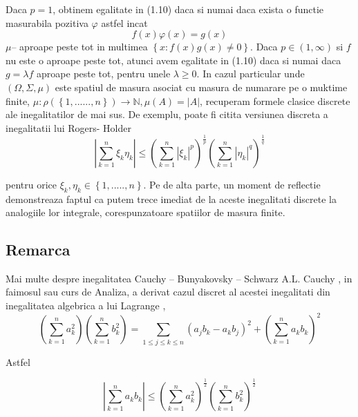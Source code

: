 \documentclass[a4paper,12pt,oneside]{report}
\begin{document}
Daca \(p = 1\), obtinem egalitate in (1.10) daca si numai daca exista o functie masurabila pozitiva \(\varphi\) astfel incat 
\begin{displaymath}
  f\left ( x \right )\varphi \left ( x \right ) = g\left ( x \right )
\end{displaymath}
\(\mu –\) aproape peste tot in multimea \(\left \{ x : f\left ( x \right )g\left ( x \right )\neq 0 \right \}\). 
	Daca \(p \in \left ( 1 , \infty  \right )\) si \(f\) nu este o aproape peste tot, atunci avem egalitate in (1.10) daca si numai daca  \(g = \lambda f\) aproape peste tot, pentru unele \(\lambda \geq 0\). 
	In  cazul particular unde \(\left ( \Omega , \Sigma, \mu \right )\) este spatiul de masura asociat cu masura de numarare pe o muktime finite, \(\mu  : \rho \left ( \left \{ 1,......, n \right \} \right )\rightarrow \mathbb{N}, \mu \left ( A \right ) = \left | A \right |\), 
recuperam formele clasice discrete ale inegalitatilor de mai sus. De exemplu, poate fi citita versiunea discreta a inegalitatii lui Rogers- Holder
\begin{displaymath}
  \left | \sum_{k=1}^{n} \xi _{k}\eta _{k}\right |\leq \left ( \sum_{k = 1}^{n}\left | \xi _{k}\right |^{p}  \right )^{\frac{1}{p}}\left ( \sum_{k = 1}^{n} \left | \eta _{k} \right |^{q}\right )^{\frac{1}{q}}
\end{displaymath}

pentru  orice \(\xi _{k}, \eta _{k} \in \left \{ 1,.....,n \right \}.\) Pe de alta parte, un moment de reflectie demonstreaza faptul ca putem trece imediat de la aceste inegalitati discrete la analogiile lor integrale, corespunzatoare spatiilor de masura finite. 

\subsection{Remarca}

Mai multe despre inegalitatea Cauchy – Bunyakovsky – Schwarz
A.L. Cauchy , in faimosul sau curs de Analiza, a derivat cazul discret al acestei inegalitati din inegalitatea algebrica a  lui Lagrange ,
\begin{displaymath}
  \left ( \sum_{k = 1}^{n} a_{k}^{2}\right )\left ( \sum_{k = 1}^{n} b_{k}^{2}\right ) =  \sum_{1\leq j\leq k\leq n}\left ( a_{j}b_{k} - a_{k}b_{j} \right )^{2} + \left ( \sum_{k = 1}^{n} a_{k}b_{k}\right )^{2}
\end{displaymath}

Astfel 

\begin{displaymath}
  \left | \sum_{k = 1}^{n} a_{k}b_{k} \right |\leq \left ( \sum_{k = 1}^{n}a_{k}^{2} \right )^{\frac{1}{2}}\left ( \sum_{k = 1}^{n}b_{k}^{2} \right )^{\frac{1}{2}}
\end{displaymath}
\end{document}
